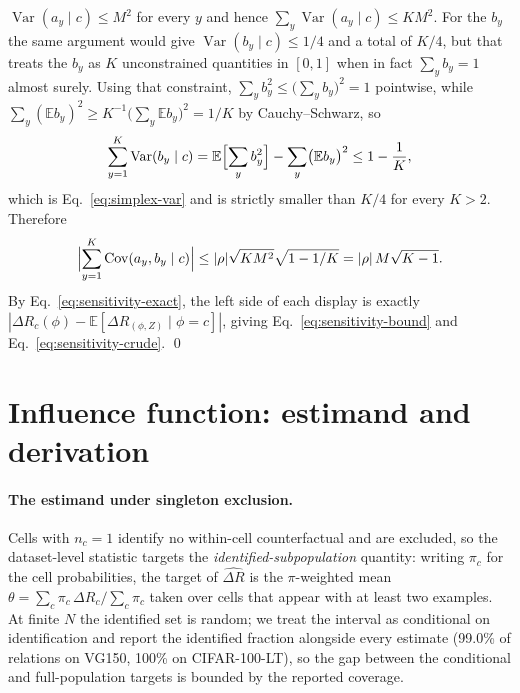 $\operatorname{Var}(a_y\mid c)\le M^2$ for every $y$ and hence
$\sum_y\operatorname{Var}(a_y\mid c)\le KM^2$. For the $b_y$ the same argument would give
$\operatorname{Var}(b_y\mid c)\le1/4$ and a total of $K/4$, but that treats the $b_y$ as
$K$ unconstrained quantities in $[0,1]$ when in fact $\sum_yb_y=1$ almost surely. Using
that constraint, $\sum_yb_y^2\le\bigl(\sum_yb_y\bigr)^2=1$ pointwise, while
$\sum_y(\mathbb E b_y)^2\ge K^{-1}\bigl(\sum_y\mathbb E b_y\bigr)^2=1/K$ by
Cauchy--Schwarz, so
\[
\sum_{y=1}^K\operatorname{Var}(b_y\mid c)
=\mathbb E\Bigl[\sum_yb_y^2\Bigr]-\sum_y\bigl(\mathbb E b_y\bigr)^2\le1-\frac1K,
\]
which is Eq.~\eqref{eq:simplex-var} and is strictly smaller than $K/4$ for every $K>2$.
Therefore
\[
\Bigl|\sum_{y=1}^K\operatorname{Cov}(a_y,b_y\mid c)\Bigr|
\le|\rho|\sqrt{KM^2}\sqrt{1-1/K}=|\rho|\,M\sqrt{K-1}.
\]
By Eq.~\eqref{eq:sensitivity-exact}, the left side of each display is exactly
$|\Delta R_c(\phi)-\mathbb E[\Delta R_{(\phi,Z)}\mid\phi=c]|$, giving
Eq.~\eqref{eq:sensitivity-bound} and Eq.~\eqref{eq:sensitivity-crude}. \qed

\section{Influence function: estimand and derivation}\label{app:influence}

\paragraph{The estimand under singleton exclusion.} Cells with $n_c=1$ identify no
within-cell counterfactual and are excluded, so the dataset-level statistic targets the
\emph{identified-subpopulation} quantity: writing $\pi_c$ for the cell probabilities,
the target of $\widehat{\Delta R}$ is the $\pi$-weighted mean
$\theta=\sum_c\pi_c\,\Delta R_c/\sum_c\pi_c$ taken over cells that appear with at least
two examples. At finite $N$ the identified set is random; we treat the interval as
conditional on identification and report the identified fraction alongside every
estimate (99.0\% of relations on VG150, 100\% on CIFAR-100-LT), so the gap between the
conditional and full-population targets is bounded by the reported coverage.

